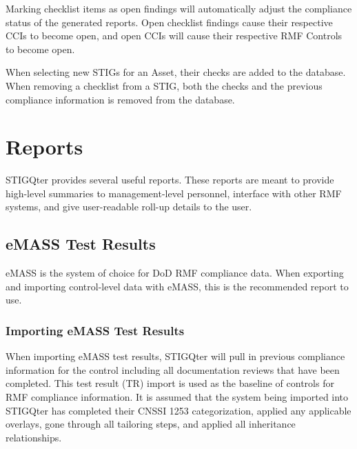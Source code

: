 \documentclass[letterpaper, 10pt, twoside]{article}
\begin{document}
Marking checklist items as open findings will automatically adjust the compliance status of the generated reports. Open checklist findings cause their respective CCIs to become open, and open CCIs will cause their respective RMF Controls to become open.

When selecting new STIGs for an Asset, their checks are added to the database. When removing a checklist from a STIG, both the checks and the previous compliance information is removed from the database.

\section{Reports}

STIGQter provides several useful reports. These reports are meant to provide high-level summaries to management-level personnel, interface with other RMF systems, and give user-readable roll-up details to the user.

\subsection{eMASS Test Results}

eMASS is the system of choice for DoD RMF compliance data. When exporting and importing control-level data with eMASS, this is the recommended report to use.

\subsubsection{Importing eMASS Test Results}

When importing eMASS test results, STIGQter will pull in previous compliance information for the control including all documentation reviews that have been completed. This test result (TR) import is used as the baseline of controls for RMF compliance information. It is assumed that the system being imported into STIGQter has completed their CNSSI 1253 categorization, applied any applicable overlays, gone through all tailoring steps, and applied all inheritance relationships.
\end{document}
